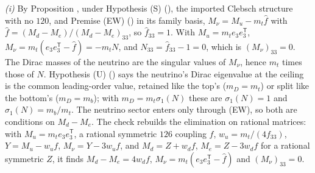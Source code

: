 \emph{(i)} By Proposition , under Hypothesis (S) (), the imported Clebsch structure with no $120$, and Premise (EW) () in its family basis, $M_{\nu} = M_{u} - m_{t}\hat{f}$ with $\hat{f} = (M_{d} - M_{e})/(M_{d} - M_{e})_{33}$, so $\hat{f}_{33} = 1$. With $M_{u} = m_{t}e_{3}e_{3}^{\mathsf{T}}$, $M_{\nu} = m_{t}(e_{3}e_{3}^{\mathsf{T}} - \hat{f}) = -m_{t}N$, and $N_{33} = \hat{f}_{33} - 1 = 0$, which is $(M_{\nu})_{33} = 0$. The Dirac masses of the neutrino are the singular values of $M_{\nu}$, hence $m_{t}$ times those of $N$. Hypothesis (U) () says the neutrino's Dirac eigenvalue at the ceiling is the common leading-order value, retained like the top's ($m_{D} = m_{t}$) or split like the bottom's ($m_{D} = m_{b}$); with $m_{D} = m_{t}\sigma_{1}(N)$ these are $\sigma_{1}(N) = 1$ and $\sigma_{1}(N) = m_{b}/m_{t}$. The neutrino sector enters only through (EW), so both are conditions on $M_{d} - M_{e}$. The check rebuilds the elimination on rational matrices: with $M_{u} = m_{t}e_{3}e_{3}^{\mathsf{T}}$, a rational symmetric $126$ coupling $f$, $w_{u} = m_{t}/(4f_{33})$, $Y = M_{u} - w_{u}f$, $M_{\nu} = Y - 3w_{u}f$, and $M_{d} = Z + w_{d}f$, $M_{e} = Z - 3w_{d}f$ for a rational symmetric $Z$, it finds $M_{d} - M_{e} = 4w_{d}f$, $M_{\nu} = m_{t}(e_{3}e_{3}^{\mathsf{T}} - \hat{f})$ and $(M_{\nu})_{33} = 0$.

